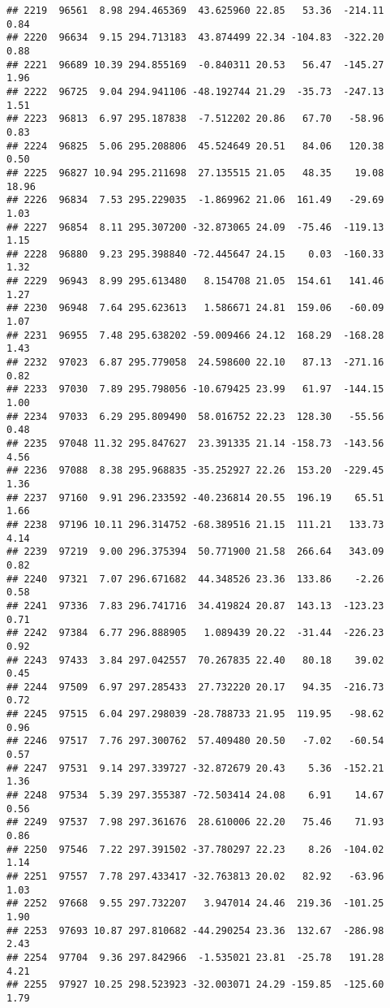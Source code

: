 \documentclass[]{article}
\begin{document}
\begin{verbatim}
## 2219  96561  8.98 294.465369  43.625960 22.85   53.36  -214.11  0.84
## 2220  96634  9.15 294.713183  43.874499 22.34 -104.83  -322.20  0.88
## 2221  96689 10.39 294.855169  -0.840311 20.53   56.47  -145.27  1.96
## 2222  96725  9.04 294.941106 -48.192744 21.29  -35.73  -247.13  1.51
## 2223  96813  6.97 295.187838  -7.512202 20.86   67.70   -58.96  0.83
## 2224  96825  5.06 295.208806  45.524649 20.51   84.06   120.38  0.50
## 2225  96827 10.94 295.211698  27.135515 21.05   48.35    19.08 18.96
## 2226  96834  7.53 295.229035  -1.869962 21.06  161.49   -29.69  1.03
## 2227  96854  8.11 295.307200 -32.873065 24.09  -75.46  -119.13  1.15
## 2228  96880  9.23 295.398840 -72.445647 24.15    0.03  -160.33  1.32
## 2229  96943  8.99 295.613480   8.154708 21.05  154.61   141.46  1.27
## 2230  96948  7.64 295.623613   1.586671 24.81  159.06   -60.09  1.07
## 2231  96955  7.48 295.638202 -59.009466 24.12  168.29  -168.28  1.43
## 2232  97023  6.87 295.779058  24.598600 22.10   87.13  -271.16  0.82
## 2233  97030  7.89 295.798056 -10.679425 23.99   61.97  -144.15  1.00
## 2234  97033  6.29 295.809490  58.016752 22.23  128.30   -55.56  0.48
## 2235  97048 11.32 295.847627  23.391335 21.14 -158.73  -143.56  4.56
## 2236  97088  8.38 295.968835 -35.252927 22.26  153.20  -229.45  1.36
## 2237  97160  9.91 296.233592 -40.236814 20.55  196.19    65.51  1.66
## 2238  97196 10.11 296.314752 -68.389516 21.15  111.21   133.73  4.14
## 2239  97219  9.00 296.375394  50.771900 21.58  266.64   343.09  0.82
## 2240  97321  7.07 296.671682  44.348526 23.36  133.86    -2.26  0.58
## 2241  97336  7.83 296.741716  34.419824 20.87  143.13  -123.23  0.71
## 2242  97384  6.77 296.888905   1.089439 20.22  -31.44  -226.23  0.92
## 2243  97433  3.84 297.042557  70.267835 22.40   80.18    39.02  0.45
## 2244  97509  6.97 297.285433  27.732220 20.17   94.35  -216.73  0.72
## 2245  97515  6.04 297.298039 -28.788733 21.95  119.95   -98.62  0.96
## 2246  97517  7.76 297.300762  57.409480 20.50   -7.02   -60.54  0.57
## 2247  97531  9.14 297.339727 -32.872679 20.43    5.36  -152.21  1.36
## 2248  97534  5.39 297.355387 -72.503414 24.08    6.91    14.67  0.56
## 2249  97537  7.98 297.361676  28.610006 22.20   75.46    71.93  0.86
## 2250  97546  7.22 297.391502 -37.780297 22.23    8.26  -104.02  1.14
## 2251  97557  7.78 297.433417 -32.763813 20.02   82.92   -63.96  1.03
## 2252  97668  9.55 297.732207   3.947014 24.46  219.36  -101.25  1.90
## 2253  97693 10.87 297.810682 -44.290254 23.36  132.67  -286.98  2.43
## 2254  97704  9.36 297.842966  -1.535021 23.81  -25.78   191.28  4.21
## 2255  97927 10.25 298.523923 -32.003071 24.29 -159.85  -125.60  1.79

\end{verbatim}
\end{document}
